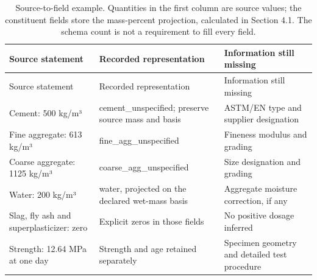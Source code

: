 \documentclass[
  american,
  11pt,
  letterpaper,
]{article}
\renewcommand{\texttt}[1]{{\ttfamily\fontsize{9.5}{11}\selectfont\hyphenchar\font=-1 #1}}
\begin{document}
\begin{longtable}[]{@{}
  >{\raggedright\arraybackslash}p{}
  >{\raggedright\arraybackslash}p{}
  >{\raggedright\arraybackslash}p{}@{}}
\caption{Source-to-field example. Quantities in the first column are
source values; the constituent fields store the mass-percent projection,
calculated in Section 4.1. The schema count is not a requirement to fill
every field.}\tabularnewline
\toprule\noalign{}
\begin{minipage}[b]{\linewidth}\raggedright
Source statement
\end{minipage} & \begin{minipage}[b]{\linewidth}\raggedright
Recorded representation
\end{minipage} & \begin{minipage}[b]{\linewidth}\raggedright
Information still missing
\end{minipage} \\
\midrule\noalign{}
\endfirsthead
\toprule\noalign{}
\begin{minipage}[b]{\linewidth}\raggedright
Source statement
\end{minipage} & \begin{minipage}[b]{\linewidth}\raggedright
Recorded representation
\end{minipage} & \begin{minipage}[b]{\linewidth}\raggedright
Information still missing
\end{minipage} \\
\midrule\noalign{}
\endhead
\bottomrule\noalign{}
\endlastfoot
Cement: 500 kg/m³ & \texttt{cement\_unspecified}; preserve source mass
and basis & ASTM/EN type and supplier designation \\
Fine aggregate: 613 kg/m³ & \texttt{fine\_agg\_unspecified} & Fineness
modulus and grading \\
Coarse aggregate: 1125 kg/m³ & \texttt{coarse\_agg\_unspecified} & Size
designation and grading \\
Water: 200 kg/m³ & \texttt{water}, projected on the declared wet-mass
basis & Aggregate moisture correction, if any \\
Slag, fly ash and superplasticizer: zero & Explicit zeros in those
fields & No positive dosage inferred \\
Strength: 12.64 MPa at one day & Strength and age retained separately &
Specimen geometry and detailed test procedure \\
\end{longtable}
\end{document}
